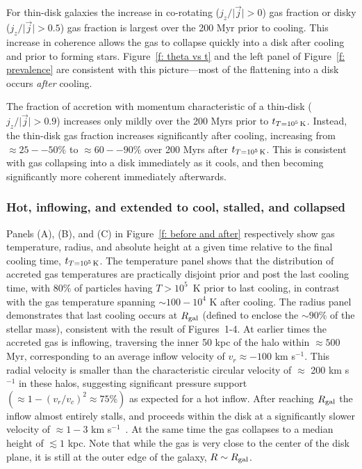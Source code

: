 \documentclass[fleqn,usenatbib]{mnras}
\newcommand{\tcon}{t_{T=10^5\,{\rm K}}}
\begin{document}
For thin-disk galaxies the increase in co-rotating ($j_z/\vert \vec j \vert > 0$) gas fraction or disky ($j_z/\vert \vec j \vert > 0.5$) gas fraction is largest over the 200 Myr prior to cooling.
This increase in coherence allows the gas to collapse quickly into a disk after cooling and prior to forming stars.
Figure~\ref{f: theta vs t} and the left panel of Figure~\ref{f: prevalence} are consistent with this picture---most of the flattening into a disk occurs \textit{after} cooling.

The fraction of accretion with momentum characteristic of a thin-disk ($j_z / \vert \vec j \vert > 0.9$) increases only mildly over the 200 Myrs prior to $\tcon$.
Instead, the thin-disk gas fraction increases significantly after cooling, increasing from $\approx 25--50\%$ to $\approx 60--90\%$ over 200 Myrs after $\tcon$.
This is consistent with gas collapsing into a disk immediately as it cools, and then becoming significantly more coherent immediately afterwards.

\subsubsection{Hot, inflowing, and extended to cool, stalled, and collapsed}
\label{s: mechanics -- temp and radius}


Panels (A), (B), and (C) in Figure~\ref{f: before and after} respectively show gas temperature, radius, and absolute height at a given time relative to the final cooling time, $\tcon$.
The temperature panel shows that the distribution of accreted gas temperatures are practically disjoint prior and post the last cooling time, with $80\%$ of particles having $T > 10^5$~K prior to last cooling, in contrast with the gas temperature spanning $\sim100- 10^4$ K after cooling. 
The radius panel demonstrates that last cooling occurs at $R_{\rm gal}$ (defined to enclose the $\sim90\%$ of the stellar mass), consistent with the result of  Figures~1-4.
At earlier times the accreted gas is inflowing, traversing the inner 50 kpc of the halo within $\approx500$ Myr, corresponding to an average inflow velocity of $v_r\approx-100$ km s$^{-1}$.
This radial velocity is smaller than the characteristic circular velocity of $\approx$ 200 km s$^{-1}$ in these halos, suggesting significant pressure support $(\approx1-(v_r/v_c)^2\approx75\%)$ as expected for a hot inflow.
After reaching $R_{\rm gal}$ the inflow almost entirely stalls, and proceeds within the disk at a significantly slower velocity of $\approx1-3$ km s$^{-1}$~\citep{Trapp2021}.
At the same time the gas collapses to a median height of $\lesssim 1$ kpc.
Note that while the gas is very close to the center of the disk plane, it is still at the outer edge of the galaxy, $R \sim R_{\rm gal}$.
\end{document}

